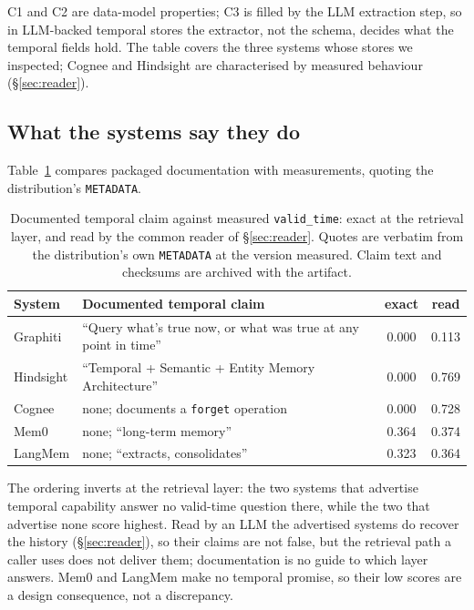 \documentclass[conference]{IEEEtran}
\begin{document}
C1 and C2 are data-model properties; C3 is filled by the LLM extraction step,
so in LLM-backed temporal stores the extractor, not the schema, decides what the
temporal fields hold. The table covers the three systems whose stores we
inspected; Cognee and Hindsight are characterised by measured behaviour
(\S\ref{sec:reader}).

\subsection{What the systems say they do}
\label{sec:claims}

Table~\ref{tab:claims} compares packaged documentation with measurements,
quoting the distribution's \texttt{METADATA}.

\begin{table}[t]
\centering
\caption{Documented temporal claim against measured \texttt{valid\_time}: exact at
the retrieval layer, and read by the common reader of \S\ref{sec:reader}. Quotes are verbatim from the distribution's own
\texttt{METADATA} at the version measured.
Claim text and checksums are archived with the artifact.}
\label{tab:claims}
\small
\begin{tabular}{@{}l>{\raggedright\arraybackslash}p{3.7cm}cc@{}}
\toprule
System & Documented temporal claim & exact & read \\
\midrule
Graphiti  & ``Query what's true now, or what was true at any point in time'' & 0.000 & 0.113 \\
Hindsight & ``Temporal + Semantic + Entity Memory Architecture'' & 0.000 & 0.769 \\
Cognee    & none; documents a \texttt{forget} operation & 0.000 & 0.728 \\
Mem0      & none; ``long-term memory'' & 0.364 & 0.374 \\
LangMem   & none; ``extracts, consolidates'' & 0.323 & 0.364 \\
\bottomrule
\end{tabular}
\end{table}

The ordering inverts at the retrieval layer: the two systems that advertise
temporal capability answer no valid-time question there, while the two that
advertise none score highest. Read by an LLM the advertised systems do recover
the history (\S\ref{sec:reader}), so their claims are not false, but the
retrieval path a caller uses does not deliver them; documentation is no guide to
which layer answers. Mem0 and LangMem make no temporal promise, so their low
scores are a design consequence, not a discrepancy.
\end{document}
